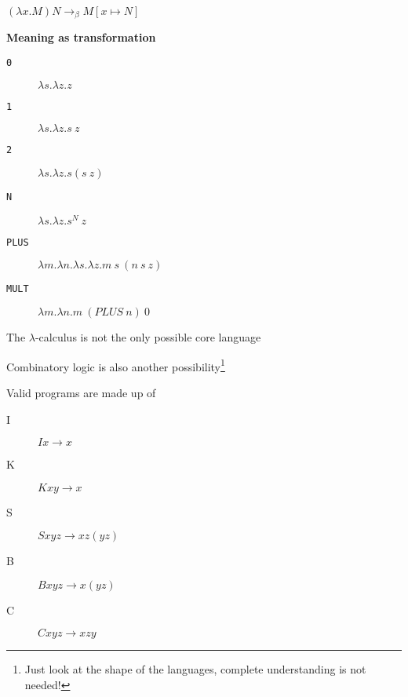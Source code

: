 \documentclass{beamer}
\begin{document}
\begin{slide}{
\item $(\lambda x.M) N \rightarrow_\beta M[x \mapsto N] $
\item \textbf{Meaning as transformation}
}\end{slide}

\begin{textslide}{
\begin{description}
\item[\texttt{0}] $\lambda s.\lambda z.z$
\item[\texttt{1}] $\lambda s.\lambda z.s\ z$
\item[\texttt{2}] $\lambda s.\lambda z.s(s\ z)$
\item[\texttt{N}] $\lambda s.\lambda z.s^N\ z$
\end{description}
}\end{textslide}

\begin{textslide}{
\begin{description}
\item[\texttt{PLUS}] $\lambda m.\lambda n.\lambda s.\lambda z.m\ s\ (n\ s\ z)$
\item[\texttt{MULT}] $\lambda m.\lambda n.m\ (PLUS\ n)\ 0$
\end{description}
}\end{textslide}

\begin{slide}{
\item The $\lambda$-calculus is not the only possible core language
\item Combinatory logic is also another possibility\footnote{Just look at the shape of the languages, complete understanding is not needed!}
}\end{slide}

\begin{textslide}{
Valid programs are made up of
\begin{description}
\item[I] $Ix \rightarrow x$
\item[K] $Kxy \rightarrow x$
\item[S] $Sxyz \rightarrow xz(yz)$
\item[B] $Bxyz \rightarrow x(yz)$
\item[C] $Cxyz \rightarrow xzy$
\end{description}
}\end{textslide}
\end{document}
